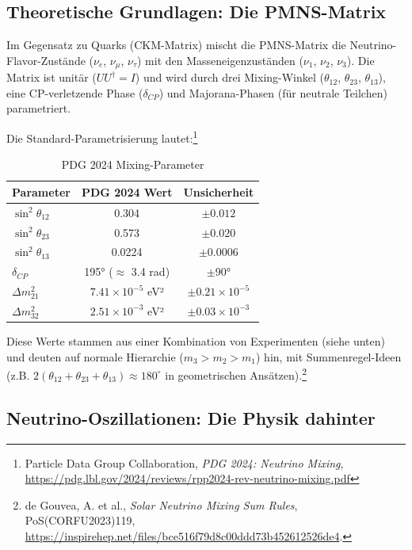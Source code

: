 	\subsection{Theoretische Grundlagen: Die PMNS-Matrix}
	
	Im Gegensatz zu Quarks (CKM-Matrix) mischt die PMNS-Matrix die Neutrino-Flavor-Zustände ($\nu_e$, $\nu_\mu$, $\nu_\tau$) mit den Masseneigenzuständen ($\nu_1$, $\nu_2$, $\nu_3$). Die Matrix ist unitär ($U U^\dagger = I$) und wird durch drei Mixing-Winkel ($\theta_{12}$, $\theta_{23}$, $\theta_{13}$), eine CP-verletzende Phase ($\delta_{CP}$) und Majorana-Phasen (für neutrale Teilchen) parametriert.
	
	Die Standard-Parametrisierung lautet:\footnote{Particle Data Group Collaboration, \emph{PDG 2024: Neutrino Mixing}, \url{https://pdg.lbl.gov/2024/reviews/rpp2024-rev-neutrino-mixing.pdf}}
	
	\begin{table}[h]
		\centering
		\begin{tabular}{lcc}
			\toprule
			\textbf{Parameter} & \textbf{PDG 2024 Wert} & \textbf{Unsicherheit} \\
			\midrule
			$\sin^2 \theta_{12}$ & 0.304 & $\pm 0.012$ \\
			$\sin^2 \theta_{23}$ & 0.573 & $\pm 0.020$ \\
			$\sin^2 \theta_{13}$ & 0.0224 & $\pm 0.0006$ \\
			$\delta_{CP}$ & 195° ($\approx$ 3.4 rad) & $\pm$90° \\
			$\Delta m^2_{21}$ & $7.41 \times 10^{-5}$ eV² & $\pm 0.21 \times 10^{-5}$ \\
			$\Delta m^2_{32}$ & $2.51 \times 10^{-3}$ eV² & $\pm 0.03 \times 10^{-3}$ \\
			\bottomrule
		\end{tabular}
		\caption{PDG 2024 Mixing-Parameter}
		\label{tab:pdgparams}
	\end{table}
	
	Diese Werte stammen aus einer Kombination von Experimenten (siehe unten) und deuten auf normale Hierarchie ($m_3 > m_2 > m_1$) hin, mit Summenregel-Ideen (z.B. $2(\theta_{12} + \theta_{23} + \theta_{13}) \approx 180^\circ$ in geometrischen Ansätzen).\footnote{de Gouvea, A. et al., \emph{Solar Neutrino Mixing Sum Rules}, PoS(CORFU2023)119, \url{https://inspirehep.net/files/bce516f79d8c00ddd73b452612526de4}.}
	
	\subsection{Neutrino-Oszillationen: Die Physik dahinter}
	
